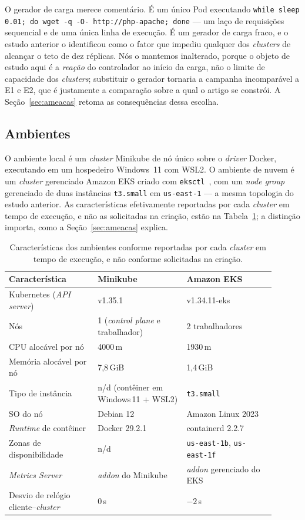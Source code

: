 \documentclass[conference]{IEEEtran}
\begin{document}
O gerador de carga merece comentário. É um único Pod executando
\texttt{while sleep 0.01; do wget -q -O- http://php-apache; done} --- um laço de
requisições sequencial e de uma única linha de execução. É um gerador de carga
fraco, e o estudo anterior o identificou como o fator que impediu qualquer dos
\emph{clusters} de alcançar o teto de dez réplicas. Nós o mantemos inalterado,
porque o objeto de estudo aqui é a \emph{reação} do controlador ao início da
carga, não o limite de capacidade dos \emph{clusters}; substituir o gerador
tornaria a campanha incomparável a E1 e E2, que é justamente a comparação sobre a
qual o artigo se constrói. A Seção~\ref{sec:ameacas} retoma as consequências
dessa escolha.

\subsection{Ambientes}

O ambiente local é um \emph{cluster} Minikube de nó único sobre o \emph{driver}
Docker, executando em um hospedeiro Windows~11 com WSL2. O ambiente de nuvem é um
\emph{cluster} gerenciado Amazon EKS criado com \texttt{eksctl}~\cite{eksctl},
com um \emph{node group} gerenciado de duas instâncias \texttt{t3.small} em
\texttt{us-east-1} --- a mesma topologia do estudo anterior. As características
efetivamente reportadas por cada \emph{cluster} em tempo de execução, e não as
solicitadas na criação, estão na Tabela~\ref{tab:ambientes}; a distinção importa,
como a Seção~\ref{sec:ameacas} explica.

\begin{table}[!t]
\centering
\caption{Características dos ambientes conforme reportadas por cada
\emph{cluster} em tempo de execução, e não conforme solicitadas na criação.}
\label{tab:ambientes}
\footnotesize
\begin{tabular}{@{}p{0.30\linewidth}p{0.30\linewidth}p{0.30\linewidth}@{}}
\toprule
\textbf{Característica} & \textbf{Minikube} & \textbf{Amazon EKS}\\
\midrule
Kubernetes (\emph{API server}) & v1.35.1 & v1.34.11-eks\\
Nós & 1 (\emph{control plane} e trabalhador) & 2 trabalhadores\\
CPU alocável por nó & 4000\,m & 1930\,m\\
Memória alocável por nó & 7,8\,GiB & 1,4\,GiB\\
Tipo de instância & n/d (contêiner em Windows\,11 + WSL2) & \texttt{t3.small}\\
SO do nó & Debian 12 & Amazon Linux 2023\\
\emph{Runtime} de contêiner & Docker 29.2.1 & containerd 2.2.7\\
Zonas de disponibilidade & n/d & \texttt{us-east-1b}, \texttt{us-east-1f}\\
\emph{Metrics Server} & \emph{addon} do Minikube & \emph{addon} gerenciado do EKS\\
Desvio de relógio cliente--\emph{cluster} & 0\,s & $-2$\,s\\
\bottomrule
\end{tabular}
\end{table}
\end{document}
